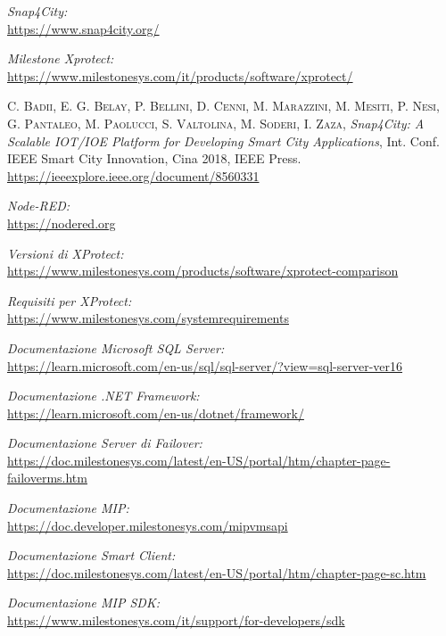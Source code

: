 \documentclass[a4paper, openright, thesis]{report}
\begin{document}
\begin{thebibliography}{9}
\emph{Snap4City: \\}
\url{https://www.snap4city.org/}

\emph{Milestone Xprotect: \\}
\url{https://www.milestonesys.com/it/products/software/xprotect/}

\textsc{C. Badii, E. G. Belay, P. Bellini, D. Cenni, M. Marazzini, M. Mesiti, P. Nesi, G. Pantaleo, M. Paolucci, S. Valtolina, M. Soderi, I. Zaza}, 
\emph{Snap4City: A Scalable IOT/IOE Platform for Developing Smart City Applications}, 
Int. Conf. IEEE Smart City Innovation, Cina 2018, IEEE Press.\\
\url{https://ieeexplore.ieee.org/document/8560331}

\emph{Node-RED: \\}
\url{ https://nodered.org}

\emph{Versioni di XProtect: \\}
\url{https://www.milestonesys.com/products/software/xprotect-comparison}

\emph{Requisiti per XProtect: \\}
\url{https://www.milestonesys.com/systemrequirements}

\emph{Documentazione Microsoft SQL Server: \\}
\url{https://learn.microsoft.com/en-us/sql/sql-server/?view=sql-server-ver16}

\emph{Documentazione .NET Framework: \\}
\url{https://learn.microsoft.com/en-us/dotnet/framework/}

\emph{Documentazione Server di Failover: \\}
\url{https://doc.milestonesys.com/latest/en-US/portal/htm/chapter-page-failoverms.htm}

\emph{Documentazione MIP: \\}
\url{https://doc.developer.milestonesys.com/mipvmsapi}

\emph{Documentazione Smart Client: \\}
\url{https://doc.milestonesys.com/latest/en-US/portal/htm/chapter-page-sc.htm}

\emph{Documentazione MIP SDK: \\}
\url{https://www.milestonesys.com/it/support/for-developers/sdk}


\end{thebibliography}
\end{document}
